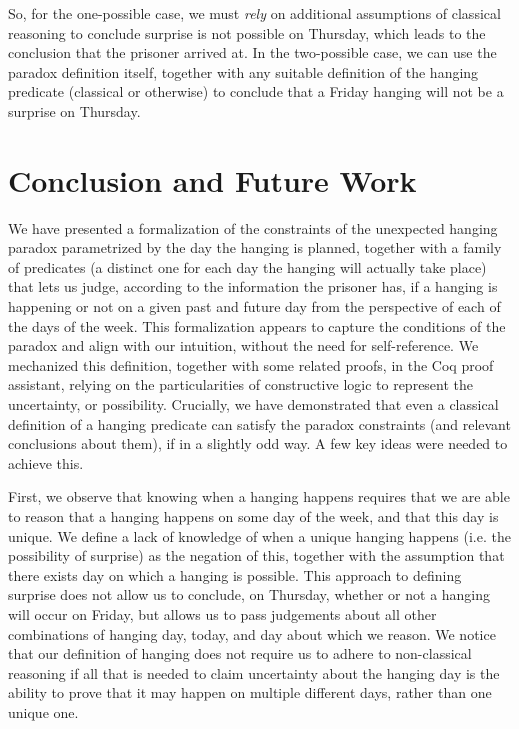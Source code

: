 \documentclass[runningheads]{llncs}
\begin{document}
So, for the one-possible case, we must \emph{rely} on additional assumptions of
classical reasoning to conclude surprise is not possible on Thursday,
which leads to the conclusion that the prisoner arrived at.
In the two-possible case, we can use the paradox definition itself, together with
any suitable definition of the hanging predicate (classical or otherwise) to conclude that a Friday
hanging will not be a surprise on Thursday.

\section{Conclusion and Future Work}

We have presented a formalization of the constraints of the unexpected hanging paradox
parametrized by the day the hanging is planned,
together with a family of predicates (a distinct one for each day the hanging
will actually take place) that lets us judge, according to the information the prisoner has,
if a hanging is happening or not on
a given past and future day from the perspective of each of the days of the week.
This formalization appears to capture the
conditions of the paradox and align with our intuition, without the need
for self-reference.
We mechanized this definition, together with some related proofs, in the Coq
proof assistant, relying on the particularities of constructive logic to represent
the uncertainty, or possibility. Crucially, we have demonstrated that
even a classical definition of a hanging predicate can satisfy the paradox
constraints (and relevant conclusions about them), if in a slightly odd way.
A few key ideas were needed to achieve this.

First, we observe that knowing when a hanging happens requires that we are able to
reason that a hanging happens on some day of the week, and that this day is unique.
We define a lack of knowledge of when a unique hanging happens (i.e. the possibility of surprise)
as the negation of this,
together with the assumption that there exists day on which a hanging is possible.
This approach to defining surprise does not allow us to conclude, on Thursday,
whether or not a hanging will occur on Friday, but allows us to pass judgements
about all other combinations of hanging day, today, and day about which we reason.
We notice that
our definition of hanging does not require us to adhere to non-classical
reasoning if all that is needed to claim uncertainty about the hanging day
is the ability to prove that it may happen on multiple different days, rather than one unique one.
\end{document}
